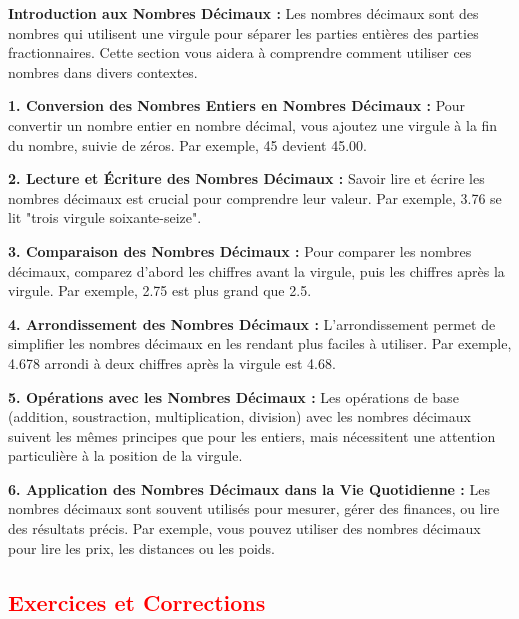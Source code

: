 \documentclass{article}
\begin{document}
\begin{tcolorbox}[colback=blue!10!white, colframe=blue!75!black, sharp corners=south, boxrule=0.8mm, title=Applications directes]
    \textbf{Introduction aux Nombres Décimaux :}
    Les nombres décimaux sont des nombres qui utilisent une virgule pour séparer les parties entières des parties fractionnaires. Cette section vous aidera à comprendre comment utiliser ces nombres dans divers contextes.

    \textbf{1. Conversion des Nombres Entiers en Nombres Décimaux :}
    Pour convertir un nombre entier en nombre décimal, vous ajoutez une virgule à la fin du nombre, suivie de zéros. Par exemple, 45 devient 45.00.

    \textbf{2. Lecture et Écriture des Nombres Décimaux :}
    Savoir lire et écrire les nombres décimaux est crucial pour comprendre leur valeur. Par exemple, 3.76 se lit "trois virgule soixante-seize".

    \textbf{3. Comparaison des Nombres Décimaux :}
    Pour comparer les nombres décimaux, comparez d'abord les chiffres avant la virgule, puis les chiffres après la virgule. Par exemple, 2.75 est plus grand que 2.5.

    \textbf{4. Arrondissement des Nombres Décimaux :}
    L'arrondissement permet de simplifier les nombres décimaux en les rendant plus faciles à utiliser. Par exemple, 4.678 arrondi à deux chiffres après la virgule est 4.68.

    \textbf{5. Opérations avec les Nombres Décimaux :}
    Les opérations de base (addition, soustraction, multiplication, division) avec les nombres décimaux suivent les mêmes principes que pour les entiers, mais nécessitent une attention particulière à la position de la virgule.

    \textbf{6. Application des Nombres Décimaux dans la Vie Quotidienne :}
    Les nombres décimaux sont souvent utilisés pour mesurer, gérer des finances, ou lire des résultats précis. Par exemple, vous pouvez utiliser des nombres décimaux pour lire les prix, les distances ou les poids.
\end{tcolorbox}

\subsection{\textcolor{red}{ Exercices et Corrections}}
\end{document}
